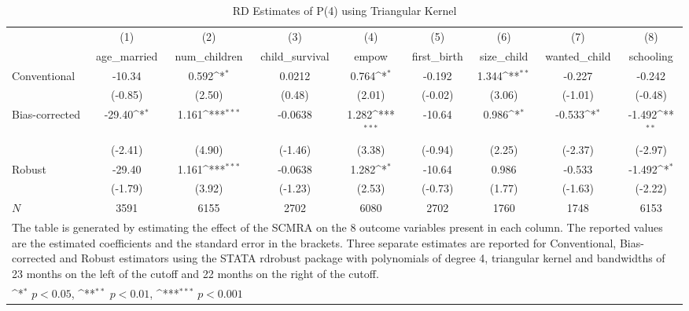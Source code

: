 \begin{table}[htbp]\centering
\def\sym#1{\ifmmode^{#1}\else\(^{#1}\)\fi}
\caption{RD Estimates of P(4) using Triangular Kernel}
\begin{tabular}{l*{8}{c}}
\toprule
            &\multicolumn{1}{c}{(1)}&\multicolumn{1}{c}{(2)}&\multicolumn{1}{c}{(3)}&\multicolumn{1}{c}{(4)}&\multicolumn{1}{c}{(5)}&\multicolumn{1}{c}{(6)}&\multicolumn{1}{c}{(7)}&\multicolumn{1}{c}{(8)}\\
            &\multicolumn{1}{c}{age\_married}&\multicolumn{1}{c}{num\_children}&\multicolumn{1}{c}{child\_survival}&\multicolumn{1}{c}{empow}&\multicolumn{1}{c}{first\_birth}&\multicolumn{1}{c}{size\_child}&\multicolumn{1}{c}{wanted\_child}&\multicolumn{1}{c}{schooling}\\
\midrule
Conventional&      -10.34         &       0.592\sym{*}  &      0.0212         &       0.764\sym{*}  &      -0.192         &       1.344\sym{**} &      -0.227         &      -0.242         \\
            &     (-0.85)         &      (2.50)         &      (0.48)         &      (2.01)         &     (-0.02)         &      (3.06)         &     (-1.01)         &     (-0.48)         \\
\addlinespace
Bias-corrected&      -29.40\sym{*}  &       1.161\sym{***}&     -0.0638         &       1.282\sym{***}&      -10.64         &       0.986\sym{*}  &      -0.533\sym{*}  &      -1.492\sym{**} \\
            &     (-2.41)         &      (4.90)         &     (-1.46)         &      (3.38)         &     (-0.94)         &      (2.25)         &     (-2.37)         &     (-2.97)         \\
\addlinespace
Robust      &      -29.40         &       1.161\sym{***}&     -0.0638         &       1.282\sym{*}  &      -10.64         &       0.986         &      -0.533         &      -1.492\sym{*}  \\
            &     (-1.79)         &      (3.92)         &     (-1.23)         &      (2.53)         &     (-0.73)         &      (1.77)         &     (-1.63)         &     (-2.22)         \\
\midrule
\(N\)       &        3591         &        6155         &        2702         &        6080         &        2702         &        1760         &        1748         &        6153         \\
\bottomrule
\multicolumn{9}{l}{\footnotesize The table is generated by estimating the effect of the SCMRA on the 8 outcome variables present in each column. The reported values are the estimated coefficients and the standard error in the brackets. Three separate estimates are reported for Conventional, Bias-corrected and Robust estimators using the STATA rdrobust package with polynomials of degree 4, triangular kernel and bandwidths of 23 months on the left of the cutoff and 22 months on the right of the cutoff.}\\
\multicolumn{9}{l}{\footnotesize \sym{*} \(p<0.05\), \sym{**} \(p<0.01\), \sym{***} \(p<0.001\)}\\
\end{tabular}
\end{table}
